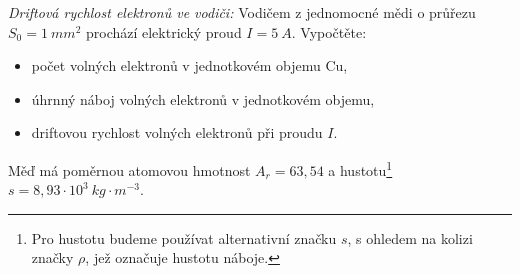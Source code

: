 \begin{example}\label{TEO:exam008} \emph{Driftová rychlost elektronů ve vodiči:} Vodičem z 
jednomocné mědi o
  průřezu $S_0 = 1\ mm^2$ prochází elektrický proud $I = 5\ A$. Vypočtěte:
  \begin{itemize}\addtolength{\itemsep}{-0.5\baselineskip}
    \item počet volných elektronů v jednotkovém objemu Cu,
    \item úhrnný náboj volných elektronů v jednotkovém objemu,
    \item driftovou rychlost volných elektronů při proudu $I$.
  \end{itemize}
  Měď má poměrnou atomovou hmotnost $A_r = 63,54$ a hustotu\footnote{Pro hustotu budeme používat 
  alternativní značku $s$, s ohledem na kolizi značky $\rho$, jež označuje hustotu náboje.} $s = 
  8,93\cdot10^3\ kg\cdot m^{-3}$.\newline
  

\end{example}
